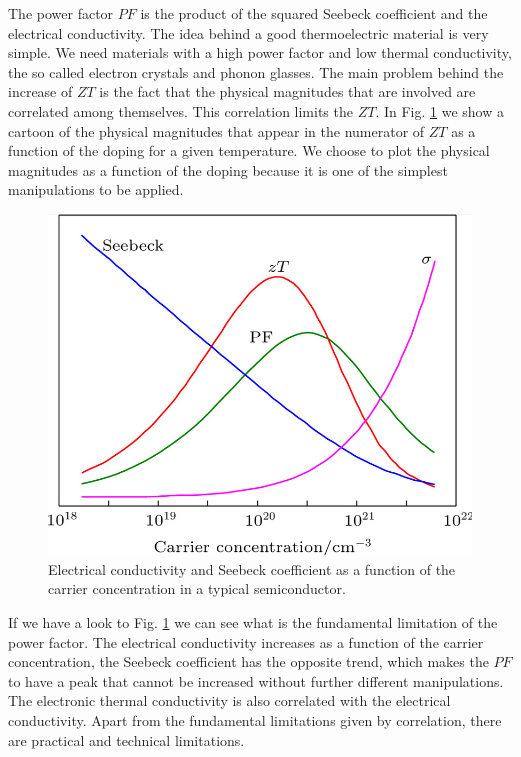 The power factor $PF$ is the product of the squared Seebeck coefficient and the electrical conductivity. The idea
behind a good thermoelectric material is very simple. We need materials with a high power factor and low thermal
conductivity, the so called electron crystals and phonon glasses. The main problem behind the increase of $ZT$ 
is the fact that the physical magnitudes that are involved are correlated among themselves. This correlation limits 
the $ZT$. In Fig. \ref{decouple} we show a cartoon of the physical magnitudes that appear in the numerator of $ZT$ 
as a function of the doping for a given temperature. We choose to plot the physical magnitudes as a function of the
doping because it is one of the simplest manipulations to be applied. 
\begin{figure}[h]
\begin{center}
\includegraphics[width=0.8\linewidth]{Figures/decoupling.png}
\caption[Thermoelectric physical magnitudes]{Electrical conductivity and  Seebeck coefficient as a function of the 
carrier concentration in a typical semiconductor.}
\label{decouple}
\end{center}
\end{figure}
If we have a look to Fig. \ref{decouple} we can see what is the fundamental limitation of the power factor. The 
electrical conductivity increases as a function of the carrier concentration, the Seebeck coefficient has 
the opposite trend, which makes the $PF$ to have a peak that cannot be increased without further different 
manipulations. The electronic thermal conductivity is also correlated with the electrical conductivity. Apart from 
the fundamental limitations given by correlation, there are practical and technical limitations. \\

